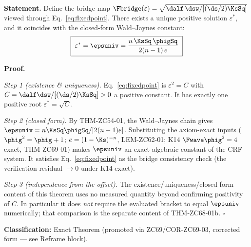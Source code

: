 \documentclass[12pt, a4paper]{article}
\begin{document}
\begin{formalbox}[title={THM-ZC68-01a: Bridge Fixed Point ---
  Existence, Uniqueness, Closed Form ($R_0$, Exact)}]

\textbf{Statement.}
Define the bridge map
$\Fbridge(\varepsilon)=\sqrt{\dalf\,\dsw/[(\ds/2)\KsSq]}$
viewed through Eq.~\eqref{eq:fixedpoint}. There exists a unique
positive solution $\varepsilon^{*}$, and it coincides with the
closed-form Wald--Jaynes constant:
\begin{equation}
  \boxed{\;
    \varepsilon^{*} = \epsuniv
    = \frac{n\,\KsSq\,\phigSq}{2(n-1)\,e}
  \;}
  \label{eq:thm01a}
\end{equation}

\textbf{Proof.}

\textit{Step 1 (existence \& uniqueness).}
Eq.~\eqref{eq:fixedpoint} is $\varepsilon^2 = C$ with
$C=\dalf\dsw/[(\ds/2)\KsSq]>0$ a positive constant. It has exactly
one positive root $\varepsilon^{*}=\sqrt{C}$.

\textit{Step 2 (closed form).}
By THM-ZC54-01, the Wald--Jaynes chain gives
$\epsuniv = n\KsSq\phigSq/[2(n-1)e]$. Substituting the axiom-exact
inputs ($\phig^2=\phig+1$; $e=(1-\Ks)^{-n}$, LEM-ZC62-01;
K14 $\Fwave\phig^2=4$ exact, THM-ZC69-01) makes $\epsuniv$ an exact
algebraic constant of the CRF system. It satisfies
Eq.~\eqref{eq:fixedpoint} as the bridge consistency check (the
verification residual $\to 0$ under K14 exact).

\textit{Step 3 (independence from the offset).}
The existence/uniqueness/closed-form content of this theorem uses no
measured quantity beyond confirming positivity of $C$. In particular
it does \emph{not} require the evaluated bracket to equal $\epsuniv$
numerically; that comparison is the separate content of
THM-ZC68-01b.
\hfill$\square$

\textbf{Classification:} Exact Theorem (promoted via ZC69/COR-ZC69-03,
corrected form --- see Reframe block).
\end{formalbox}

\end{document}
